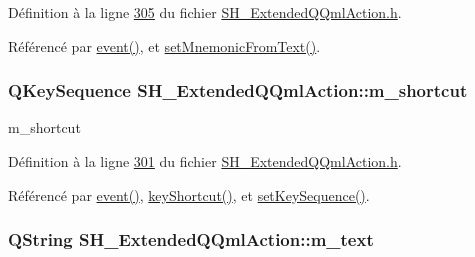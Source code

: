 Définition à la ligne \hyperlink{SH__ExtendedQQmlAction_8h_source_l00305}{305} du fichier \hyperlink{SH__ExtendedQQmlAction_8h_source}{S\-H\-\_\-\-Extended\-Q\-Qml\-Action.\-h}.



Référencé par \hyperlink{classSH__ExtendedQQmlAction_a218053d85e9fc54e06ab39b1bb37dd4b}{event()}, et \hyperlink{classSH__ExtendedQQmlAction_a717e828cb0341e3d77eabe05e6143032}{set\-Mnemonic\-From\-Text()}.

\hypertarget{classSH__ExtendedQQmlAction_ac84d3a2113efb715321b905580b08bc5}{
\subsubsection[{m\-\_\-shortcut}]{\setlength{\rightskip}{0pt plus 5cm}Q\-Key\-Sequence S\-H\-\_\-\-Extended\-Q\-Qml\-Action\-::m\-\_\-shortcut\hspace{0.3cm}{\ttfamily [private]}}}\label{classSH__ExtendedQQmlAction_ac84d3a2113efb715321b905580b08bc5}


m\-\_\-shortcut 



Définition à la ligne \hyperlink{SH__ExtendedQQmlAction_8h_source_l00301}{301} du fichier \hyperlink{SH__ExtendedQQmlAction_8h_source}{S\-H\-\_\-\-Extended\-Q\-Qml\-Action.\-h}.



Référencé par \hyperlink{classSH__ExtendedQQmlAction_a218053d85e9fc54e06ab39b1bb37dd4b}{event()}, \hyperlink{classSH__ExtendedQQmlAction_a2efb60c1b33a04e8e58ef9184dccbd2d}{key\-Shortcut()}, et \hyperlink{classSH__ExtendedQQmlAction_a7d624821268cc19aa44bcda3cd85b967}{set\-Key\-Sequence()}.

\hypertarget{classSH__ExtendedQQmlAction_a8fd83c5e68691a582fa7e0c62d661c71}{
\subsubsection[{m\-\_\-text}]{\setlength{\rightskip}{0pt plus 5cm}Q\-String S\-H\-\_\-\-Extended\-Q\-Qml\-Action\-::m\-\_\-text\hspace{0.3cm}{\ttfamily [private]}}}\label{classSH__ExtendedQQmlAction_a8fd83c5e68691a582fa7e0c62d661c71}


